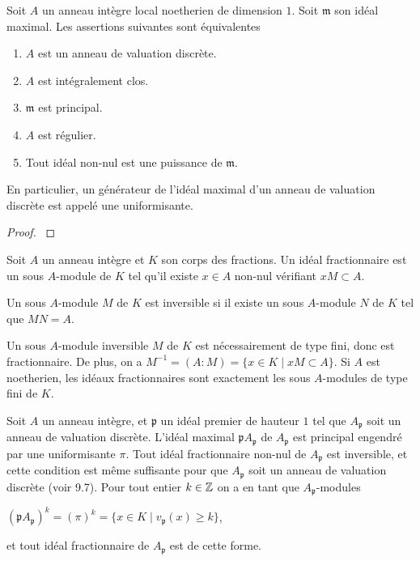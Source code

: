 \begin{prop}\label{DVRCarac}
Soit $A$ un anneau intègre local noetherien de dimension $1$. Soit $\mathfrak{m}$ son idéal maximal. Les assertions suivantes sont équivalentes
\begin{enumerate}
\item $A$ est un anneau de valuation discrète.
\item $A$ est intégralement clos.
\item $\mathfrak{m}$ est principal.
\item $A$ est régulier.
\item Tout idéal non-nul est une puissance de $\mathfrak{m}$.
\end{enumerate}
En particulier, un générateur de l'idéal maximal d'un anneau de valuation discrète est appelé une uniformisante.
\end{prop}
\begin{proof}
\cite[9.2]{atiyahmacdo} 
\end{proof}

\begin{defn}
Soit $A$ un anneau intègre et $K$ son corps des fractions. Un idéal fractionnaire est un sous $A$-module de $K$ tel qu'il existe $x\in A$ non-nul vérifiant $xM\subset A$.
\end{defn}

\begin{defn}\label{DefIdealInvertible}
Un sous $A$-module $M$ de $K$ est inversible si il existe un sous $A$-module $N$ de $K$ tel que $MN=A$.
\end{defn}

Un sous $A$-module inversible $M$ de $K$ est nécessairement de type fini, donc est fractionnaire. De plus, on a $M^{-1}=(A:M)=\lbrace x\in K\mid xM\subset A\rbrace$. Si $A$ est noetherien, les idéaux fractionnaires sont exactement les sous $A$-modules de type fini de $K$. 

Soit $A$ un anneau intègre, et $\mathfrak{p}$ un idéal premier de hauteur $1$ tel que $A_\mathfrak{p}$ soit un anneau de valuation discrète. L'idéal maximal $\mathfrak{p}A_\mathfrak{p}$ de $A_\mathfrak{p}$ est principal engendré par une uniformisante $\pi$. Tout idéal fractionnaire non-nul de $A_\mathfrak{p}$ est inversible, et cette condition est même suffisante pour que $A_\mathfrak{p}$ soit un anneau de valuation discrète (voir \cite{atiyahmacdo} 9.7). Pour tout entier $k\in \mathbb{Z}$ on a en tant que $A_\mathfrak{p}$-modules
\begin{center}
$(\mathfrak{p}A_\mathfrak{p})^k=(\pi)^k=\lbrace x\in K\mid v_\mathfrak{p}(x)\geq k \rbrace$,
\end{center}
et tout idéal fractionnaire de $A_\mathfrak{p}$ est de cette forme.


